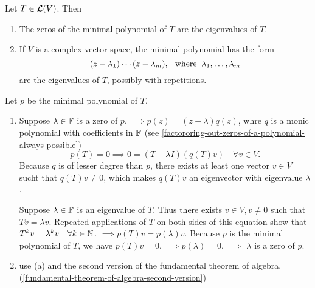 \setcounter{thm}{26}
\begin{thm}
  \label{thm:zeros-of-the-minimal-polynomial-of-T-are-the-eigenvalues-of-T}
  Let $T \in \mathcal{L}(V)$. Then
  \begin{enumerate}[label=(\alph*)]
    \item The zeros of the minimal polynomial of $T$ are the eigenvalues of $T$.
    \item If $V$ is a complex vector space, the minimal polynomial has the form 
    \begin{equation}
      (z-\lambda_1)\cdots(z-\lambda_m), \;\;\, \text{where}\;\; \lambda_1, \dots, \lambda_m
    \end{equation} are the eigenvalues of $T$, possibly with repetitions.
  \end{enumerate}
\end{thm}
\begin{prf} Let $p$ be the minimal polynomial of $T$.
  \begin{enumerate}[label=(\alph*)]
    \item Suppose $\lambda \in \mathbb{F}$ is a zero of $p$. $\implies p(z)=(z-\lambda)q(z)$, whre $q$ is a monic polynomial with coefficients in $\mathbb{F}$ (see \ref{factororing-out-zeros-of-a-polynomial-always-possible})
    \begin{equation}
      p(T)=0\implies 0=(T-\lambda I)(q(T)v) \quad \forall v\in V.
    \end{equation}
    Because $q$ is of lesser degree than $p$, there exists at least one vector $v\in V$ sucht that $q(T)v \neq 0$, which makes $q(T)v$ an eigenvector with eigenvalue $\lambda$.

    Suppose $\lambda \in \mathbb{F}$ is an eigenvalue of $T$. Thus there exists $v\in V, v \neq 0$ such that $Tv=\lambda v$. Repeated applications of $T$ on both sides of this equation show that $T^kv =\lambda^k v \quad \forall k\in \mathbb{N}$.
    $\implies p(T)v=p(\lambda)v$. Because $p$ is the minimal polynomial of $T$, we have $p(T)v=0$. $\implies p(\lambda) = 0$. $\implies$ $\lambda$ is a zero of $p$.

    \item use (a) and the second version of the fundamental theorem of algebra. (\ref{fundamental-theorem-of-algebra-second-version})
  \end{enumerate}
\end{prf}

